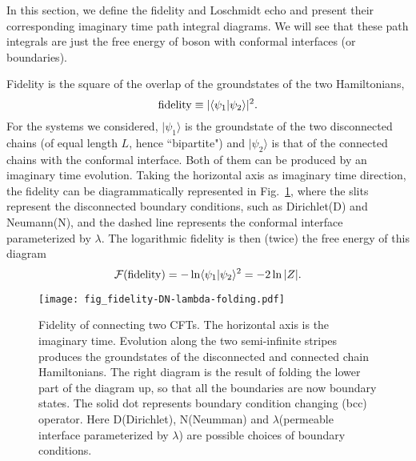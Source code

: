 
In this section, we define the fidelity and Loschmidt echo and present their corresponding imaginary time path integral diagrams.  We will see that these path integrals are just the free energy of boson with conformal interfaces (or boundaries). 

Fidelity is the square of the overlap of the groundstates of the two Hamiltonians, 
\begin{equation}
{\rm fidelity} \equiv |\langle \psi_1 |\psi_2  \rangle |^2 .
\end{equation}
For the systems we considered, $|\psi_1 \rangle$ is the groundstate of the two disconnected chains (of equal length $L$, hence ``bipartite") and $|\psi_2\rangle$ is that of the connected chains with the conformal interface. Both of them can be produced by an imaginary time evolution. Taking the horizontal axis as imaginary time direction, the fidelity can be diagrammatically represented in Fig.~\ref{fig:fidel}, where the slits represent the disconnected boundary conditions, such as Dirichlet(D) and Neumann(N), and the dashed line represents the conformal interface parameterized by $\lambda$. The logarithmic fidelity is then (twice) the free energy of this diagram
\begin{equation}
\mathcal{F}( {\rm fidelity} )  = - \ln \langle \psi_1 |\psi_2 \rangle^2 = - 2 \ln |Z|.
\end{equation}

\begin{figure}[h]
\texttt{[image: fig\_fidelity-DN-lambda-folding.pdf]}
\caption{Fidelity of connecting two CFTs. The horizontal axis is the imaginary time. Evolution along the two semi-infinite stripes produces the groundstates of the disconnected and connected chain Hamiltonians. The right diagram is the result of folding the lower part of the diagram up, so that all the boundaries are now boundary states. The solid dot represents boundary condition changing (bcc) operator. Here D(Dirichlet), N(Neumman) and $\lambda$(permeable interface parameterized by $\lambda$) are possible choices of boundary conditions.}
\label{fig:fidel}
\end{figure}

